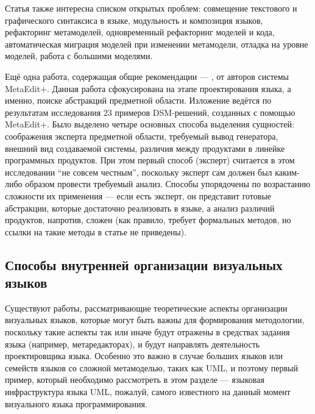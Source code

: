 Статья также интересна списком открытых проблем: совмещение текстового и графического 
синтаксиса в языке, модульность и композиция языков, рефакторинг метамоделей, одновременный 
рефакторинг моделей и кода, автоматическая миграция моделей при изменении метамодели, 
отладка на уровне моделей, работа с большими моделями.

Ещё одна работа, содержащая общие рекомендации --- \cite{luoma2004defining}, от авторов 
системы MetaEdit+. Данная работа сфокусирована на этапе проектирования языка, а именно, 
поиске абстракций предметной области. Изложение ведётся по результатам исследования 
23 примеров DSM-решений, созданных с помощью MetaEdit+. Было выделено четыре основных 
способа выделения сущностей: соображения эксперта предметной области, требуемый вывод 
генератора, внешний вид создаваемой системы, различия между продуктами в линейке программных 
продуктов. При этом первый способ (эксперт) считается в этом исследовании "`не совсем 
честным"', поскольку эксперт сам должен был каким-либо образом провести требуемый 
анализ. Способы упорядочены по возрастанию сложности их применения --- если есть эксперт, 
он представит готовые абстракции, которые достаточно реализовать в языке, а анализ 
различий продуктов, напротив, сложен (как правило, требует формальных методов, но 
ссылки на такие методы в статье не приведены).

\subsection{Способы внутренней организации визуальных языков}
Существуют работы, рассматривающие теоретические аспекты организации визуальных языков, 
которые могут быть важны для формирования методологии, поскольку такие аспекты так 
или иначе будут отражены в средствах задания языка (например, метаредакторах), и будут 
направлять деятельность проектировщика языка. Особенно это важно в случае больших 
языков или семейств языков со сложной метамоделью, таких как UML, и поэтому первый 
пример, который необходимо рассмотреть в этом разделе --- языковая инфраструктура 
языка UML, пожалуй, самого известного на данный момент визуального языка программирования.

